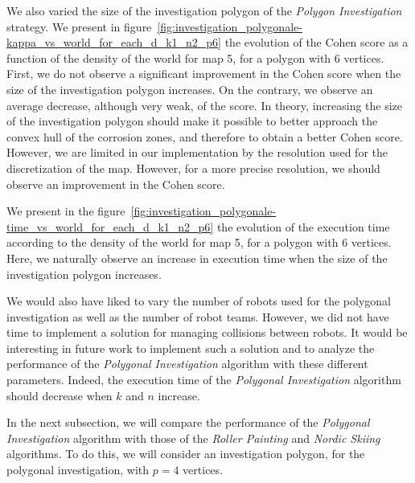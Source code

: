 We also varied the size of the investigation polygon of the \textit{Polygon Investigation} strategy.
We present in figure~\ref{fig:investigation_polygonale-kappa_vs_world_for_each_d_k1_n2_p6} the evolution of the Cohen score as a function of the density of the world for map 5, for a polygon with 6 vertices.
First, we do not observe a significant improvement in the Cohen score when the size of the investigation polygon increases.
On the contrary, we observe an average decrease, although very weak, of the score.
In theory, increasing the size of the investigation polygon should make it possible to better approach the convex hull of the corrosion zones, and therefore to obtain a better Cohen score.
However, we are limited in our implementation by the resolution used for the discretization of the map.
However, for a more precise resolution, we should observe an improvement in the Cohen score.

We present in the figure~\ref{fig:investigation_polygonale-time_vs_world_for_each_d_k1_n2_p6} the evolution of the execution time according to the density of the world for map 5, for a polygon with 6 vertices.
Here, we naturally observe an increase in execution time when the size of the investigation polygon increases.

We would also have liked to vary the number of robots used for the polygonal investigation as well as the number of robot teams.
However, we did not have time to implement a solution for managing collisions between robots.
It would be interesting in future work to implement such a solution and to analyze the performance of the \textit{Polygonal Investigation} algorithm with these different parameters.
Indeed, the execution time of the \textit{Polygonal Investigation} algorithm should decrease when $k$ and $n$ increase.

In the next subsection, we will compare the performance of the \textit{Polygonal Investigation} algorithm with those of the \textit{Roller Painting} and \textit{Nordic Skiing} algorithms.
To do this, we will consider an investigation polygon, for the polygonal investigation, with $p = 4$ vertices.

